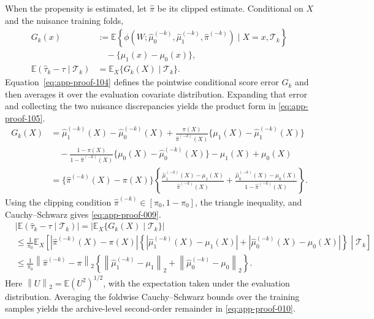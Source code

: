 \documentclass[11pt]{article}
\numberwithin{equation}{section}
\newcommand{\E}{\mathbb E}
\newcommand{\1}{\mathbf 1}
\newcommand{\norm}[1]{\left\lVert #1\right\rVert}
\newcommand{\abs}[1]{\left\lvert #1\right\rvert}
\begin{document}
When the propensity is estimated, let \(\widehat\pi\) be its clipped estimate.  Conditional on \(X\) and the nuisance training folds,
\begin{equation}
\label{eq:app-proof-104}
\begin{aligned}
G_k(x)
&:=\E\!\left\{
\phi(W;\widehat\mu_0^{(-k)},\widehat\mu_1^{(-k)},
\widehat\pi^{(-k)})
\mid X=x,\mathcal T_k
\right\}\\
&\quad-\{\mu_1(x)-\mu_0(x)\},\\
\E(\widehat\tau_k-\tau\mid\mathcal T_k)
&=\E_X\{G_k(X)\mid\mathcal T_k\}.
\end{aligned}
\end{equation}
Equation~\eqref{eq:app-proof-104} defines the pointwise conditional score error \(G_k\) and then averages it over the evaluation covariate distribution.  Expanding that error and collecting the
two nuisance discrepancies yields the product form in
\eqref{eq:app-proof-105}.
\begin{equation}
\label{eq:app-proof-105}
\begin{aligned}
G_k(X)
&=\widehat\mu_1^{(-k)}(X)-\widehat\mu_0^{(-k)}(X)
+\frac{\pi(X)}{\widehat\pi^{(-k)}(X)}
 \{\mu_1(X)-\widehat\mu_1^{(-k)}(X)\}\\
&\quad-\frac{1-\pi(X)}{1-\widehat\pi^{(-k)}(X)}
 \{\mu_0(X)-\widehat\mu_0^{(-k)}(X)\}
-\mu_1(X)+\mu_0(X)\\
&=\{\widehat\pi^{(-k)}(X)-\pi(X)\}
\left\{
\frac{\widehat\mu_1^{(-k)}(X)-\mu_1(X)}{\widehat\pi^{(-k)}(X)}
+\frac{\widehat\mu_0^{(-k)}(X)-\mu_0(X)}{1-\widehat\pi^{(-k)}(X)}
\right\}.
\end{aligned}
\end{equation}
Using the clipping condition \(\widehat\pi^{(-k)}\in[\pi_0,1-\pi_0]\), the triangle inequality, and Cauchy--Schwarz gives \eqref{eq:app-proof-009}.
\begin{equation}
\label{eq:app-proof-009}
\begin{aligned}
&\abs{\E(\widehat\tau_k-\tau\mid\mathcal T_k)}
=\abs{\E_X\{G_k(X)\mid\mathcal T_k\}}\\
&\le \frac{1}{\pi_0}
\E_X\!\left[
\abs{\widehat\pi^{(-k)}(X)-\pi(X)}
\left\{
\abs{\widehat\mu_1^{(-k)}(X)-\mu_1(X)}
+\abs{\widehat\mu_0^{(-k)}(X)-\mu_0(X)}
\right\}
\middle|\mathcal T_k
\right]\\
&\le\frac{1}{\pi_0}
\norm{\widehat\pi^{(-k)}-\pi}_{2}
\left\{
\norm{\widehat\mu_1^{(-k)}-\mu_1}_{2}
+\norm{\widehat\mu_0^{(-k)}-\mu_0}_{2}
\right\}.
\end{aligned}
\end{equation}
Here \(\norm{U}_{2}=\E(U^2)^{1/2}\), with the expectation taken under the evaluation distribution.  Averaging the foldwise Cauchy--Schwarz bounds over the training samples yields the archive-level second-order remainder in \eqref{eq:app-proof-010}.
\end{document}
